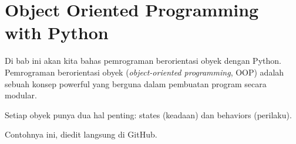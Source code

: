 \chapter{Object Oriented Programming with Python}

Di bab ini akan kita bahas pemrograman berorientasi obyek dengan Python. Pemrograman berorientasi obyek (\emph{object-oriented programming}, OOP) adalah sebuah konsep powerful yang berguna dalam pembuatan program secara modular.

Setiap obyek punya dua hal penting: states (keadaan) dan behaviors (perilaku).

Contohnya ini, diedit langsung di GitHub.

